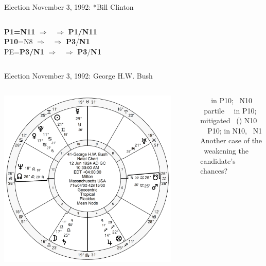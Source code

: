 \begin{frame}[t]{Election November 3, 1992: *Bill Clinton}
\begin{columns}[T, onlytextwidth]
\textbf{\dgreen P1=N11}
	$\Rightarrow$ \Sun\, $\Rightarrow$ \textbf{\dgreen P1/N11}\\
\textbf{\red P10}=N8
	$\Rightarrow$ \Venus\, $\Rightarrow$ \textbf{\red P3}/\textbf{\dgreen N1}\\
PE=\textbf{\red P3}\textbf{\dgreen /N1}
	 $\Rightarrow$ \Venus\, $\Rightarrow$ \textbf{\red P3}/\textbf{\dgreen N1}

\end{columns}
\end{frame}

\begin{frame}[t]{Election November 3, 1992: George H.W. Bush}
\small
\begin{columns}[T, onlytextwidth]
\vspace{-1em}
{\includegraphics[width=0.9\textwidth]{charts/GHW-Bush.png}}
\fontsize{8pt}{9pt}\selectfont

\Mars\, \Conjunction\, \SouthNode\, in P10; \Square\, N10 \\
\Saturn\, partile \Trine\, \Mars\, in P10; mitigated \Quincunx\, (\Opposition) N10 \\
\Sun\, \Trine\, P10; in N10, \Square\, N1 \\
\vspace{0.5em}
Another case of the \SouthNode\, weakening the candidate's chances?


\end{columns}
\end{frame}
